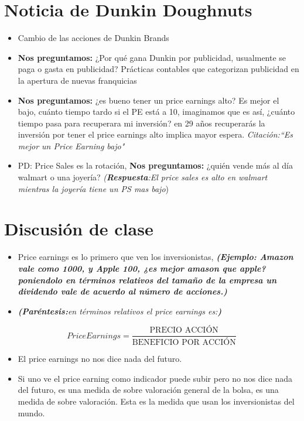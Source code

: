 \section{Noticia de Dunkin Doughnuts}
\begin{itemize}
    \item Cambio de las acciones de Dunkin Brands 
    \item \textbf{Nos preguntamos:} ¿Por qué gana Dunkin por publicidad, usualmente se paga o gasta en publicidad? Prácticas contables que categorizan publicidad en la apertura de nuevas franquicias
    \item \textbf{Nos preguntamos:} ¿es bueno tener un price earnings alto? Es mejor el bajo, cuánto tiempo tardo si el PE está a 10, imaginamos que es así, ¿cuánto tiempo pasa para recuperara mi inversión? en 29 años recuperarás la inversión por tener el price earnings alto implica mayor espera. \emph{Citación:``Es mejor un Price Earning bajo"} 
    \item PD: Price Sales es la rotación, \textbf{Nos preguntamos:} ¿quién vende más al día walmart o una joyería? \emph{(\textbf{Respuesta}:El price sales es alto en walmart mientras la joyería tiene un PS mas bajo}) 
\end{itemize}

\section{Discusión de clase}
\begin{itemize}
    \item Price earnings es lo primero que ven los inversionistas, \textbf{\emph{(Ejemplo: Amazon vale como 1000, y Apple 100, ¿es mejor amason que apple? poniendolo en términos relativos del tamaño de la empresa un dividendo vale de acuerdo al número de acciones.)}}
    \item \emph{\textbf{(Paréntesis:}en términos relativos el price earnings es:\textbf{)}}
\end{itemize}
\[
    Price Earnings = \frac{\text{PRECIO ACCIÓN}}{\text{BENEFICIO POR ACCIÓN}} 
\]
\begin{itemize}
    \item  El price earnings no nos dice nada del futuro.
    \item Si uno ve el price earning como indicador puede subir pero no nos dice nada del futuro, es una medida de sobre valoración general de la bolsa, es una medida de sobre valoración. Esta es la medida que usan los inversionistas del mundo.
\end{itemize}

